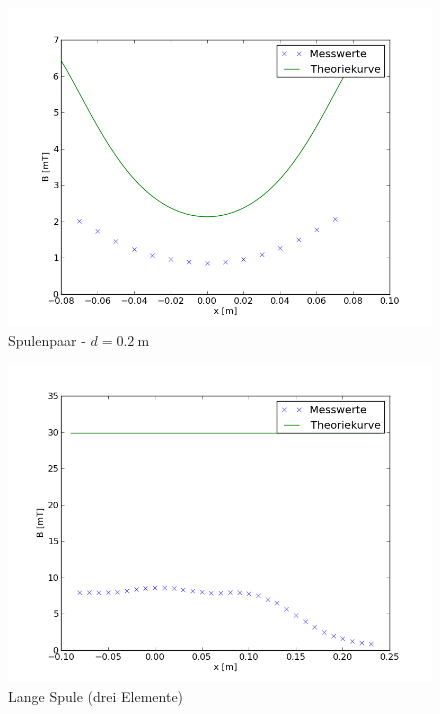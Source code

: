 \documentclass[11pt,ngerman,a4paper]{article}
\begin{document}
\begin{figure}[htp]
\centering
\includegraphics[scale=0.7]{e13.png}
\caption{Spulenpaar - $d =\SI{0.2}{\meter}$}
\label{hhspule}
\end{figure}

\begin{figure}[htp]
\centering
\includegraphics[scale=0.7]{e21.png}
\caption{Lange Spule (drei Elemente)}
\label{hhspule}
\end{figure}
\end{document}
